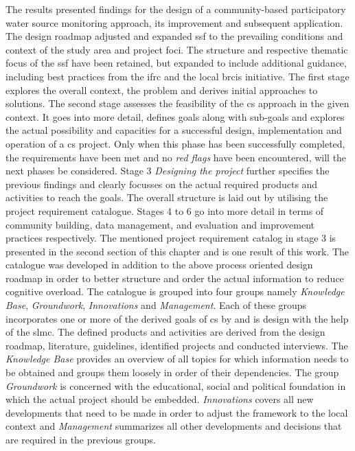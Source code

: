 The results presented findings for the design of a community-based participatory water source monitoring approach, its improvement and subsequent application. The design roadmap adjusted and expanded \autocite{fraislCitizenScienceEnvironmental2022} \acrlong{ssf} to the prevailing conditions and context of the study area and project foci. The structure and respective thematic focus of the \acrshort{ssf} have been retained, but expanded to include additional guidance, including best practices from the \acrshort{ifrc} and the local \acrshort{brcis} initiative. The first stage explores the overall context, the problem and derives initial approaches to solutions. The second stage assesses the feasibility of the \acrlong{cs} approach in the given context. It goes into more detail, defines goals along with sub-goals and explores the actual possibility and capacities for a successful design, implementation and operation of a \acrshort{cs} project. Only when this phase has been successfully completed, the requirements have been met and no \textit{red flags} have been encountered, will the next phases be considered. Stage 3 \textit{Designing the project} further specifies the previous findings and clearly focusses on the actual required products and activities to reach the goals. The overall structure is laid out by utilising the project requirement catalogue. Stages 4 to 6 go into more detail in terms of community building, data management, and evaluation and improvement practices respectively.\newline
The mentioned project requirement catalog in stage 3 is presented in the second section of this chapter and is one result of this work. The catalogue was developed in addition to the above process oriented design roadmap in order to better structure and order the actual information to reduce cognitive overload. The catalogue is grouped into four groups namely \textit{Knowledge Base}, \textit{Groundwork}, \textit{Innovations} and \textit{Management}. Each of these groups incorporates one or more of the derived goals of \acrlong{cs} by \autocite{minkmanCitizenScienceWater2015} and is design with the help of the \acrlong{slmc}. The defined products and activities are derived from the design roadmap, literature, guidelines, identified projects and conducted interviews. The \textit{Knowledge Base} provides an overview of all topics for which information needs to be obtained and groups them loosely in order of their dependencies. The group \textit{Groundwork} is concerned with the educational, social and political foundation in which the actual project should be embedded. \textit{Innovations} covers all new developments that need to be made in order to adjust the framework to the local context and \textit{Management} summarizes all other developments and decisions that are required in the previous groups.\newline
